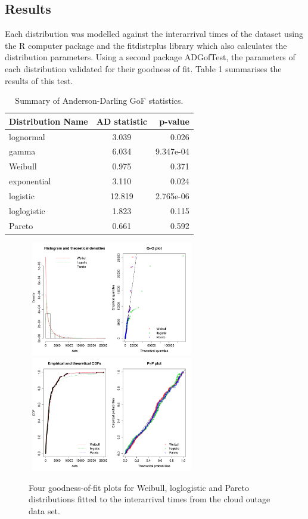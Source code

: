 \documentclass[12pt,a4paper]{article}
\begin{document}
\subsection*{Results}
Each distribution was modelled against the interarrival times of the dataset using the R computer package and the fitdistrplus library which also calculates the distribution parameters. Using a second package ADGofTest, the parameters of each distribution validated for their goodness of fit. Table 1 summarises the results of this test.

\begin{table}[!ht]\centering
\caption{\label{myname_uni:tab1} Summary of Anderson-Darling GoF statistics.}
\begin{tabular}{lcr}
Distribution Name  & AD statistic & p-value \\
\hline
lognormal  & 3.039  & 0.026  \\
gamma  & 6.034  & 9.347e-04  \\ 
Weibull   & 0.975 & 0.371 \\
exponential  & 3.110  & 0.024 \\
logistic  & 12.819 & 2.765e-06  \\
loglogistic  & 1.823  & 0.115 \\
Pareto  & 0.661  & 0.592 \\
\end{tabular}
\end{table}

\begin{figure}[ht!]\centering
\includegraphics[width=7.4cm, height=5cm]{Graphs1.pdf}
\includegraphics[width=7.4cm, height=5cm]{Graphs2.pdf}
\caption{\label{myname_uni:fig1} Four goodness-of-fit plots for Weibull, loglogistic and Pareto distributions fitted to the interarrival times from the cloud outage data set.}
\end{figure}
\end{document}
